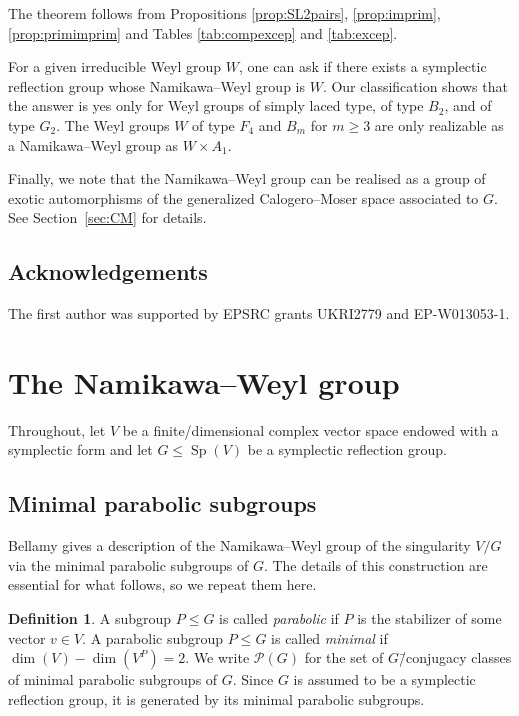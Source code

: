 \documentclass[a4paper]{amsart}
\theoremstyle{plain}
\theoremstyle{definition}
\newtheorem{definition}[theorem]{Definition}
\theoremstyle{remark}
\DeclareMathOperator{\Sp}{Sp}
\begin{document}
The theorem follows from Propositions \ref{prop:SL2pairs}, \ref{prop:imprim}, \ref{prop:primimprim} and Tables \ref{tab:compexcep} and \ref{tab:excep}.

For a given irreducible Weyl group $W$, one can ask if there exists a symplectic reflection group whose Namikawa--Weyl group is $W$.
Our classification shows that the answer is yes only for Weyl groups of simply laced type, of type \(B_2\), and of type \(G_2\).
The Weyl groups \(W\) of type \(F_4\) and \(B_m\) for \(m\geqslant 3\) are only realizable as a Namikawa--Weyl group as \(W \times A_1\).

Finally, we note that the Namikawa--Weyl group can be realised as a group of exotic automorphisms of the generalized Calogero--Moser space associated to $G$. See Section~\ref{sec:CM} for details.

\subsection*{Acknowledgements} 

The first author was supported by EPSRC grants UKRI2779 and EP-W013053-1.


\section{The Namikawa--Weyl group}
\label{sec:namikawaweyl}

Throughout, let \(V\) be a finite\-/dimensional complex vector space endowed with a symplectic form and let \(G\leqslant \Sp(V)\) be a symplectic reflection group.

\subsection{Minimal parabolic subgroups}
Bellamy \cite{Bel16} gives a description of the Namikawa--Weyl group of the singularity \(V/G\) via the minimal parabolic subgroups of \(G\). The details of this construction are essential for what follows, so we repeat them here.

\begin{definition}
  A subgroup \(P \leqslant G\) is called \emph{parabolic} if \(P\) is the stabilizer of some vector \(v\in V\).
  A parabolic subgroup \(P\leqslant G\) is called \emph{minimal} if \(\dim(V) - \dim(V^P) = 2\).
  We write \(\mathcal P(G)\) for the set of \(G\)\=/conjugacy classes of minimal parabolic subgroups of \(G\). Since $G$ is assumed to be a symplectic reflection group, it is generated by its minimal parabolic subgroups. 
\end{definition}
\end{document}

